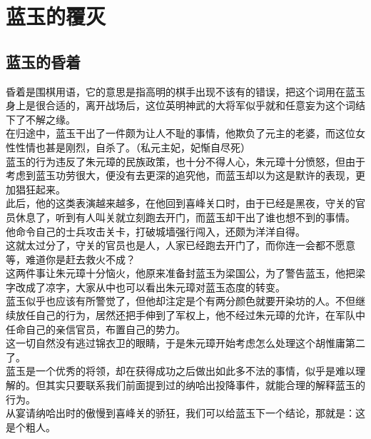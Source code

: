 \section{蓝玉的覆灭}
\ifnum{}
	\begin{multicols}{\theparacolNo}
\fi
\subsection{蓝玉的昏着}
昏着是围棋用语，它的意思是指高明的棋手出现不该有的错误，把这个词用在蓝玉身上是很合适的，离开战场后，这位英明神武的大将军似乎就和任意妄为这个词结下了不解之缘。\\

在归途中，蓝玉干出了一件颇为让人不耻的事情，他欺负了元主的老婆，而这位女性性情也甚是刚烈，自杀了。（私元主妃，妃惭自尽死）\\

蓝玉的行为违反了朱元璋的民族政策，也十分不得人心，朱元璋十分愤怒，但由于考虑到蓝玉功劳很大，便没有去更深的追究他，而蓝玉却以为这是默许的表现，更加猖狂起来。\\

此后，他的这类表演越来越多，在他回到喜峰关口时，由于已经是黑夜，守关的官员休息了，听到有人叫关就立刻跑去开门，而蓝玉却干出了谁也想不到的事情。\\

他命令自己的士兵攻击关卡，打破城墙强行闯入，还颇为洋洋自得。\\

这就太过分了，守关的官员也是人，人家已经跑去开门了，而你连一会都不愿意等，难道你是赶去救火不成？\\

这两件事让朱元璋十分恼火，他原来准备封蓝玉为梁国公，为了警告蓝玉，他把梁字改成了凉字，大家从中也可以看出朱元璋对蓝玉态度的转变。\\

蓝玉似乎也应该有所警觉了，但他却注定是个有两分颜色就要开染坊的人。不但继续放任自己的行为，居然还把手伸到了军权上，他不经过朱元璋的允许，在军队中任命自己的亲信官员，布置自己的势力。\\

这一切自然没有逃过锦衣卫的眼睛，于是朱元璋开始考虑怎么处理这个胡惟庸第二了。\\

蓝玉是一个优秀的将领，却在获得成功之后做出如此多不法的事情，似乎是难以理解的。但其实只要联系我们前面提到过的纳哈出投降事件，就能合理的解释蓝玉的行为。\\

从宴请纳哈出时的傲慢到喜峰关的骄狂，我们可以给蓝玉下一个结论，那就是：这是个粗人。\\


\end{multicols}
